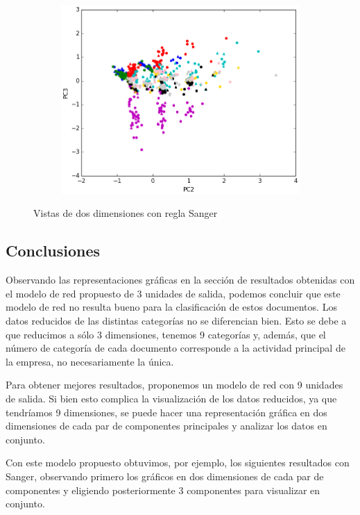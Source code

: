 \begin{figure}[ht!]
\begin{subfigure}[b]{0.5\textwidth}
		\includegraphics[width=\linewidth]{img/sanger/3dim-pc2-pc3.png}
	\end{subfigure}%
	\caption{Vistas de dos dimensiones con regla Sanger}
\end{figure}


\newpage

\subsection{Conclusiones}

Observando las representaciones gráficas en la sección de resultados obtenidas con el modelo de red propuesto de 3 unidades de salida, podemos concluir que este modelo de red no resulta bueno para la clasificación de estos documentos. Los datos reducidos de las distintas categorías no se diferencian bien. Esto se debe a que reducimos a sólo 3 dimensiones, tenemos 9 categorías y, además, que el número de categoría de cada documento corresponde a la actividad principal de la empresa, no necesariamente la única. 

Para obtener mejores resultados, proponemos un modelo de red con 9 unidades de salida. Si bien esto complica la visualización de los datos reducidos, ya que tendríamos 9 dimensiones, se puede hacer una representación gráfica en dos dimensiones de cada par de componentes principales y analizar los datos en conjunto.

Con este modelo propuesto obtuvimos, por ejemplo, los siguientes resultados con Sanger, observando primero los gráficos en dos dimensiones de cada par de componentes y eligiendo posteriormente 3 componentes para visualizar en conjunto.\\

